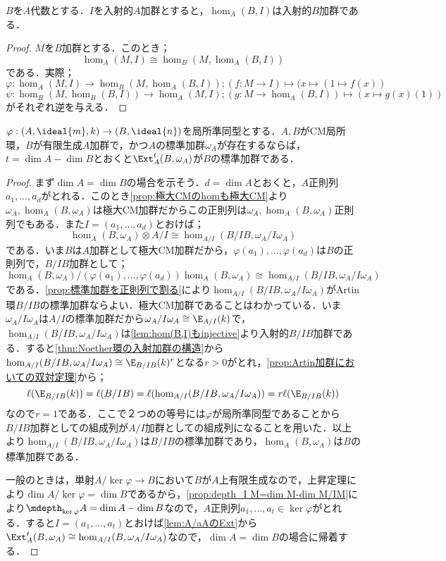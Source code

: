 \begin{lem}\label{lem:hom(B,I)もinjective}
	$B$を$A$代数とする．$I$を入射的$A$加群とすると，$\hom_A(B,I)$は入射的$B$加群である．
\end{lem}

\begin{proof}
	$M$を$B$加群とする．このとき；
	\[\hom_A(M,I)\cong\hom_B(M,\hom_A(B,I))\]
	である．実際；
	\[\varphi:\hom_A(M,I)\to\hom_B(M,\hom_A(B,I));(f:M\to I)\mapsto (x\mapsto(1\mapsto f(x))\]
	\[\psi:\hom_B(M,\hom_B(B,I))\to\hom_A(M,I);(g:M\to\hom_A(B,I))\mapsto(x\mapsto g(x)(1))\]
	がそれぞれ逆を与える．
\end{proof}

\begin{thm}\label{thm:Canonicalmoduleは遺伝する}
	$\varphi:(A,\ideal{m},k)\to(B,\ideal{n})$を局所準同型とする．$A,B$がCM局所環，$B$が有限生成$A$加群で，かつ$A$の標準加群$\omega_A$が存在するならば，$t=\dim A-\dim B$とおくと$\Ext^t_A(B,\omega_A)$が$B$の標準加群である．
\end{thm}

\begin{proof}
	まず$\dim A=\dim B$の場合を示そう．$d=\dim A$とおくと，$A$正則列$a_1,\dots,a_d$がとれる．このとき\ref{prop:極大CMのhomも極大CM}より$\omega_A,\hom_A(B,\omega_A)$は極大CM加群だからこの正則列は$\omega_A,\hom_A(B,\omega_A)$正則列でもある．また$I=(a_1,\dots,a_d)$とおけば；
	\[\hom_A(B,\omega_A)\otimes A/I\cong\hom_{A/I}(B/IB,\omega_A/I\omega_A)\]
	である．いま$B$は$A$加群として極大CM加群だから，$\varphi(a_1),\dots,\varphi(a_d)$は$B$の正則列で，$B/IB$加群として；
	\[\hom_A(B,\omega_A)/(\varphi(a_1),\dots,\varphi(a_d))\hom_A(B,\omega_A)\cong\hom_{A/I}(B/IB,\omega_A/I\omega_A)\]
	である．\ref{prop:標準加群を正則列で割る}により$\hom_{A/I}(B/IB,\omega_A/I\omega_A)$がArtin環$B/IB$の標準加群ならよい．極大CM加群であることはわかっている．いま$\omega_A/I\omega_A$は$A/I$の標準加群だから$\omega_A/I\omega_A\cong\E_{A/I}(k)$で，$\hom_{A/I}(B/IB,\omega_A/I\omega_A)$は\ref{lem:hom(B,I)もinjective}より入射的$B/IB$加群である．すると\ref{thm:Noether環の入射加群の構造}から$\hom_{A/I}(B/IB,\omega_A/I\omega_A)\cong\E_{B/IB}(k)^r$となる$r>0$がとれ，\ref{prop:Artin加群においての双対定理}から；
	\[\ell(\E_{B/IB}(k))=\ell(B/IB)=\ell(\hom_{A/I}(B/IB,\omega_A/I\omega_A))=r\ell(\E_{B/IB}(k))\]
	なので$r=1$である．ここで２つめの等号には$\varphi$が局所準同型であることから$B/IB$加群としての組成列が$A/I$加群としての組成列になることを用いた．以上より$\hom_{A/I}(B/IB,\omega_A/I\omega_A)$は$B/IB$の標準加群であり，$\hom_A(B,\omega_A)$は$B$の標準加群である．
	
	一般のときは，単射$A/\ker\varphi\to B$において$B$が$A$上有限生成なので，上昇定理により$\dim A/\ker\varphi=\dim B$であるから，\ref{prop:depth_I M=dim M-dim M/IM}により$\mdepth_{\ker\varphi}A=\dim A-\dim B$なので，$A$正則列$a_1,\dots,a_t\in\ker\varphi$がとれる．すると$I=(a_1,\dots,a_t)$とおけば\ref{lem:A/aAのExt}から$\Ext^t_A(B,\omega_A)\cong\hom_{A/I}(B,\omega_A/I\omega_A)$なので，$\dim A=\dim B$の場合に帰着する． 
\end{proof}

